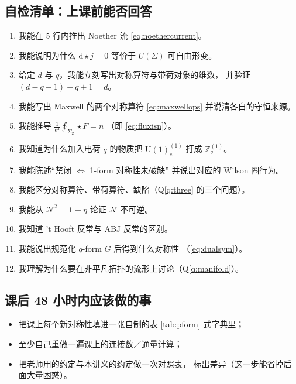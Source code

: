 \documentclass[UTF8,a4paper,11pt]{ctexart}
\theoremstyle{plain}
\theoremstyle{definition}
\theoremstyle{remark}
\newcommand{\ext}{\mathrm{d}}          %
\newcommand{\hs}{\star}                %
\newcommand{\ZZ}{\mathbb{Z}}
\newcommand{\Uone}{\mathrm{U}(1)}
\newcommand{\Ssurf}{\Sigma}
\newcommand{\Uop}{U}
\begin{document}
\subsection{自检清单：上课前能否回答}

\begin{enumerate}[label=$\square$\ ,leftmargin=1.1cm]
  \item 我能在 5 行内推出 Noether 流 \eqref{eq:noethercurrent}。
  \item 我能说明为什么 $\ext\hs j=0$ 等价于
        $\Uop(\Ssurf)$ 可自由形变。
  \item 给定 $d$ 与 $q$，我能立刻写出对称算符与带荷对象的维数，
        并验证 $(d-q-1)+q+1=d$。
  \item 我能写出 Maxwell 的两个对称算符 \eqref{eq:maxwellops}
        并说清各自的守恒来源。
  \item 我能推导 $\frac{1}{e^2}\oint_{\Ssurf_2}\hs F=n$
        （即 \eqref{eq:fluxisn}）。
  \item 我知道为什么加入电荷 $q$ 的物质把
        $\Uone^{(1)}_e$ 打成 $\ZZ_q^{(1)}$。
  \item 我能陈述“禁闭 $\Leftrightarrow$ 1-form 对称性未破缺”
        并说出对应的 Wilson 圈行为。
  \item 我能区分对称算符、带荷算符、缺陷（Q\ref{q:three} 的三个问题）。
  \item 我能从 $\mathcal N^2=\mathbf 1+\eta$ 论证 $\mathcal N$ 不可逆。
  \item 我知道 't Hooft 反常与 ABJ 反常的区别。
  \item 我能说出规范化 $q$-form $G$ 后得到什么对称性
        （\eqref{eq:dualsym}）。
  \item 我理解为什么要在非平凡拓扑的流形上讨论（Q\ref{q:manifold}）。
\end{enumerate}

\subsection{课后 48 小时内应该做的事}

\begin{itemize}
  \item 把课上每个新对称性填进一张自制的表 \ref{tab:pform} 式字典里；
  \item 至少自己重做一遍课上的连接数／通量计算；
  \item 把老师用的约定与本讲义的约定做一次对照表，
        标出差异（这一步能省掉后面大量困惑）。
\end{itemize}

\end{document}
